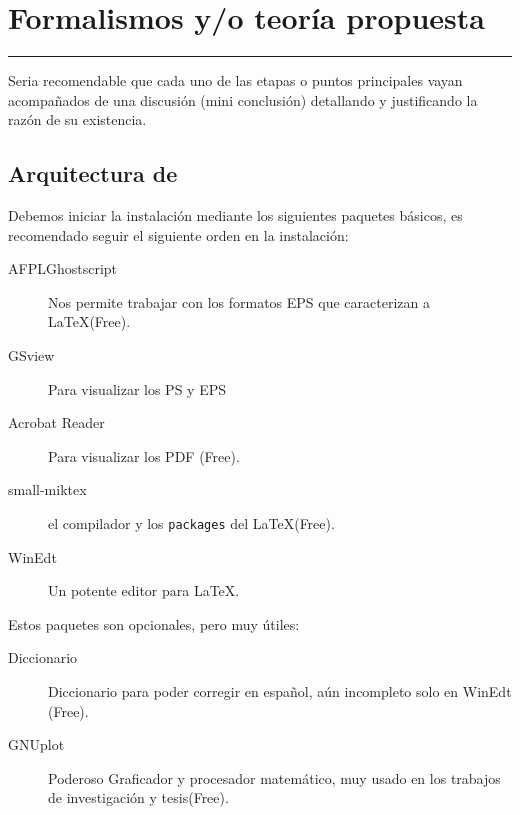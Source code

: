 \chapter{Formalismos y/o teoría propuesta}
\hrule \bigskip \vspace*{1cm}

Seria recomendable que cada uno de las etapas o puntos principales
vayan acompañados de una discusión (mini conclusión) detallando y
justificando la razón de su existencia.

\section{Arquitectura de }

Debemos iniciar la instalación mediante los siguientes paquetes
básicos, es recomendado seguir el siguiente orden en la
instalación:

\begin{description}
    \item[AFPLGhostscript] Nos permite trabajar con los formatos
    EPS que caracterizan a \LaTeX (Free).
    \item[GSview] Para visualizar los PS y EPS
    \item[Acrobat Reader] Para visualizar los PDF (Free).
    \item[small-miktex] el compilador y los \verb"packages" del
    \LaTeX (Free).
    \item[WinEdt] Un potente editor para \LaTeX.
\end{description}

Estos paquetes son opcionales, pero muy útiles:

\begin{description}
        \item[Diccionario] Diccionario para poder corregir en
    español, aún incompleto solo en WinEdt (Free).
     \item[GNUplot]Poderoso Graficador y procesador matemático, muy usado
     en los trabajos de investigación y tesis(Free).
\end{description}
